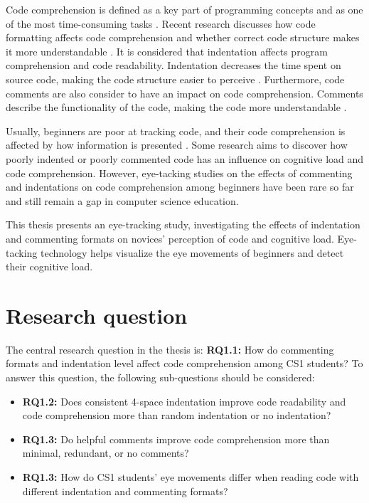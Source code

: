 Code comprehension is defined as a key part of programming concepts and as one of the most time-consuming tasks \cite{javier2021understanding}.
Recent research discusses how code formatting affects code comprehension and whether correct code structure makes it more understandable \cite{andrzejewska2020development}. It is considered that indentation affects program comprehension and code readability. Indentation decreases the time spent on source code, making the code structure easier to perceive \cite{bauer2017indentations}. Furthermore, code comments are also consider to have an impact on code comprehension. Comments describe the functionality of the code, making the code more understandable \cite{bakhuizen2019comments}.
 
Usually, beginners are poor at tracking code, and their code comprehension is affected by how information is presented \cite{robins2003learning}. Some research aims to discover how poorly indented or poorly commented code has an influence on cognitive load and code comprehension.  However, eye-tacking studies on the effects of commenting and indentations on code comprehension among beginners have been rare so far and still remain a gap in computer science education.

  
This thesis presents an eye-tracking study, investigating the effects of indentation and commenting formats on novices’ perception of code and cognitive load. Eye-tacking technology helps visualize the eye movements of beginners and detect their cognitive load. 


\section{Research question}

The central research question in the thesis is: \textbf{RQ1.1:} How do commenting formats and indentation level affect code comprehension among CS1 students? To answer this question, the following sub-questions should be considered:

\begin{itemize}
    \item \textbf{RQ1.2:} Does consistent 4-space indentation improve code readability and code comprehension more than random indentation or no indentation? 
    \item \textbf{RQ1.3:} Do helpful comments improve code comprehension more than minimal, redundant, or no comments?
    \item \textbf{RQ1.3:} How do CS1 students’ eye movements differ when reading code with different indentation and commenting formats?

\end{itemize}


